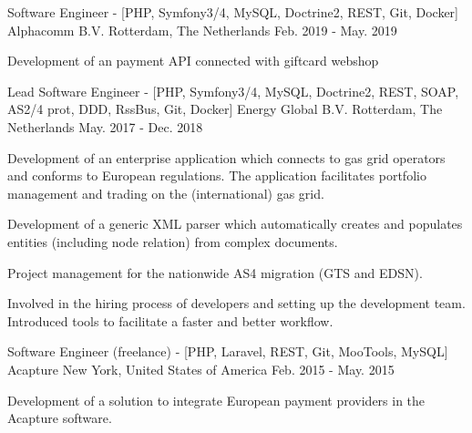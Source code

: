 \begin{cventries}
  \cventry
    {Software Engineer - [PHP, Symfony3/4, MySQL, Doctrine2, REST, Git, Docker]} %
    {Alphacomm B.V.} %
    {Rotterdam, The Netherlands} %
    {Feb. 2019 - May. 2019} %
    {
      \begin{cvitems} %
      	\item {Development of an payment API connected with giftcard webshop}
      \end{cvitems}
    }

  \cventry
    {Lead Software Engineer - [PHP, Symfony3/4, MySQL, Doctrine2, REST, SOAP, AS2/4 prot, DDD, RssBus, Git, Docker]} %
    {Energy Global B.V.} %
    {Rotterdam, The Netherlands} %
    {May. 2017 - Dec. 2018} %
    {
      \begin{cvitems} %
      	\item {Development of an enterprise application which connects to gas grid operators and conforms to European regulations. \newline The application facilitates portfolio management and trading on the (international) gas grid.}
        \item {Development of a generic XML parser which automatically creates and populates entities (including node relation) from complex documents.}
        \item {Project management for the nationwide AS4 migration (GTS and EDSN).}
        \item {Involved in the hiring process of developers and setting up the development team. Introduced tools to facilitate a faster and better workflow.}
      \end{cvitems}
    }

  \cventry
    {Software Engineer (freelance) - [PHP, Laravel, REST, Git, MooTools, MySQL]} %
    {Acapture} %
    {New York, United States of America} %
    {Feb. 2015 - May. 2015} %
    {
      \begin{cvitems} %
        \item {Development of a solution to integrate European payment providers in the Acapture software.}
      \end{cvitems}
    }
    

\end{cventries}
